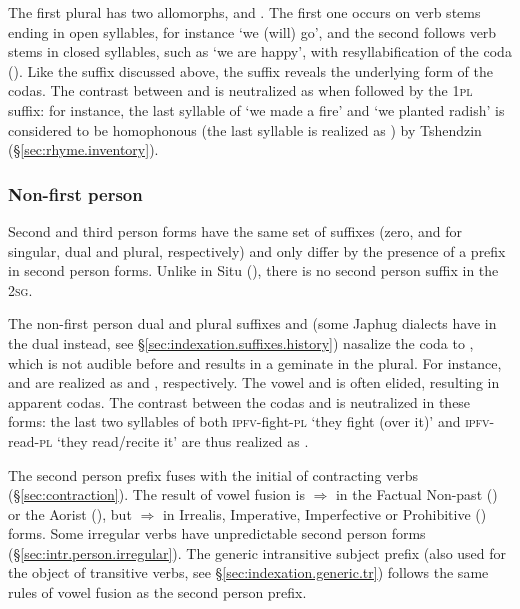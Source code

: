 The first plural  has two allomorphs,  and . The first one occurs on verb stems ending in open syllables, for instance  `we (will) go', and the second follows verb stems in closed syllables, such as  `we are happy', with resyllabification of the coda (). Like the  suffix discussed above, the suffix  reveals the underlying form of the codas. The contrast between  and  is neutralized as  when followed by the \textsc{1pl} suffix: for instance, the last syllable of  `we made a fire'  and  `we planted radish' is considered to be homophonous (the last syllable is realized as ) by Tshendzin (§\ref{sec:rhyme.inventory}).

\subsubsection{Non-first person} \label{sec:intr.23}
Second and third person forms have the same set of suffixes (zero,  and  for singular, dual and plural, respectively) and only differ by the presence of a  prefix in second person forms. Unlike in Situ (\citealt[197--208]{linxr93jiarong}), there is no second person suffix in the \textsc{2sg}.

The non-first person dual and plural suffixes  and  (some Japhug dialects have  in the dual instead, see §\ref{sec:indexation.suffixes.history}) nasalize the coda  to , which is not audible before  and results in a geminate in the plural. For instance,  and  are realized as  and , respectively. The vowel  and  is often elided, resulting in apparent  codas. The contrast between the codas  and  is neutralized in these forms: the last two syllables of both  \textsc{ipfv}-fight-\textsc{pl} `they fight (over it)' and   \textsc{ipfv}-read-\textsc{pl} `they read/recite it' are thus realized as .

The second person  prefix fuses with the initial  of contracting verbs (§\ref{sec:contraction}). The result of vowel fusion is  $\Rightarrow$  in the Factual Non-past () or the Aorist (), but  $\Rightarrow$  in Irrealis, Imperative, Imperfective or Prohibitive () forms. Some irregular verbs have unpredictable second person forms (§\ref{sec:intr.person.irregular}). The generic intransitive subject prefix  (also used for the object of transitive verbs, see §\ref{sec:indexation.generic.tr}) follows the same rules of vowel fusion as the second person prefix.


